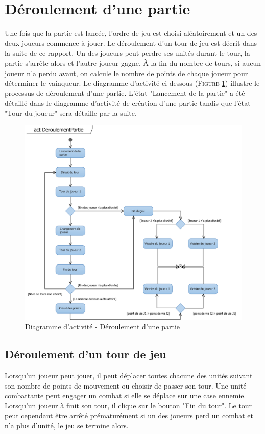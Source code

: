 \documentclass[a4paper,11pt]{article}
\begin{document}
\section{Déroulement d'une partie}
	\vspace*{0.5cm}
	Une fois que la partie est lancée, l'ordre de jeu est choisi aléatoirement et un des deux joueurs commence à jouer. Le déroulement d'un tour de jeu est décrit dans la suite de ce rapport. Un des joueurs peut perdre ses unités durant le tour, la partie s'arrête alors et l'autre joueur gagne. À la fin du nombre de tours, si aucun joueur n'a perdu avant, on calcule le nombre de points de chaque joueur pour déterminer le vainqueur. Le diagramme d'activité ci-dessous (\textsc{Figure \ref{fig:actpartie}}) illustre le processus de déroulement d'une partie. L'état "Lancement de la partie" a été détaillé dans le diagramme d'activité de création d'une partie tandis que l'état "Tour du joueur" sera détaille par la suite.

	\vspace*{1cm}
	\begin{figure}[ht!]
		\includegraphics{Diagrammes/Deroulement/actDeroulementPartie.png}
		\caption{Diagramme d'activité - Déroulement d'une partie}
		\label{fig:actpartie}
	\end{figure}
	\vspace*{1cm}
	\newpage

	\subsection{Déroulement d'un tour de jeu}
		\vspace*{0.5cm}
		Lorsqu'un joueur peut jouer, il peut déplacer toutes chacune des unités suivant son nombre de points de mouvement ou choisir de passer son tour. Une unité combattante peut engager un combat si elle se déplace sur une case ennemie. Lorsqu'un joueur à finit son tour, il clique sur le bouton "Fin du tour". Le tour peut cependant être arrêté prématurément si un des joueurs perd un combat et n'a plus d'unité, le jeu se termine alors.
		\vspace*{0.5cm}
\end{document}
